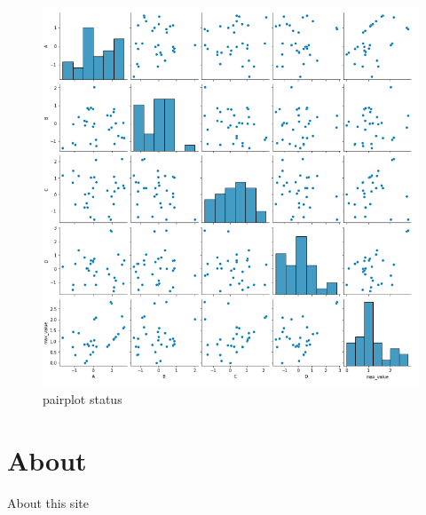 \documentclass[
  letterpaper,
  DIV=11,
  numbers=noendperiod]{scrartcl}
\begin{document}
\begin{figure}

{\centering \includegraphics{./testing_copy_files/figure-pdf/c230af73-1-image-2.png}

}

\caption{\label{fig-plot-copy}pairplot status}

\end{figure}


\hypertarget{about}{%
\chapter{About}\label{about}}

About this site
\end{document}

